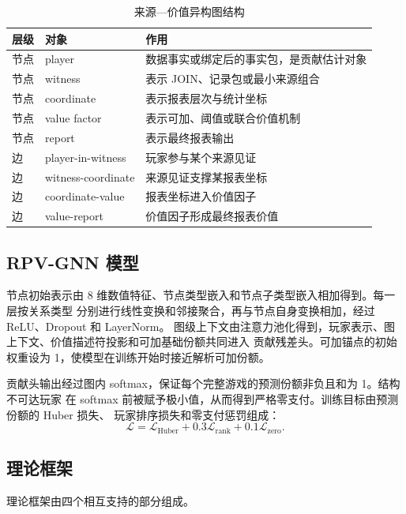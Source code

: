 \documentclass{coursepaper}
\begin{document}
\begin{table}[htbp]
  \centering
  \caption{来源—价值异构图结构}
  \label{tab:graph-schema}
  \small
  \begin{tabularx}{\textwidth}{@{}p{}p{}X@{}}
    \hline
    层级 & 对象 & 作用 \\
    \hline
    节点 & player & 数据事实或绑定后的事实包，是贡献估计对象 \\
    节点 & witness & 表示 JOIN、记录包或最小来源组合 \\
    节点 & coordinate & 表示报表层次与统计坐标 \\
    节点 & value factor & 表示可加、阈值或联合价值机制 \\
    节点 & report & 表示最终报表输出 \\
    边 & player-in-witness & 玩家参与某个来源见证 \\
    边 & witness-coordinate & 来源见证支撑某报表坐标 \\
    边 & coordinate-value & 报表坐标进入价值因子 \\
    边 & value-report & 价值因子形成最终报表价值 \\
    \hline
  \end{tabularx}
\end{table}

\subsection{RPV-GNN 模型}

节点初始表示由 8 维数值特征、节点类型嵌入和节点子类型嵌入相加得到。每一层按关系类型
分别进行线性变换和邻接聚合，再与节点自身变换相加，经过 ReLU、Dropout 和 LayerNorm。
图级上下文由注意力池化得到，玩家表示、图上下文、价值描述符投影和可加基础份额共同进入
贡献残差头。可加锚点的初始权重设为 1，使模型在训练开始时接近解析可加份额。

贡献头输出经过图内 softmax，保证每个完整游戏的预测份额非负且和为 1。结构不可达玩家
在 softmax 前被赋予极小值，从而得到严格零支付。训练目标由预测份额的 Huber 损失、
玩家排序损失和零支付惩罚组成：
\[
  \mathcal{L}
  =
  \mathcal{L}_{\mathrm{Huber}}
  +0.3\mathcal{L}_{\mathrm{rank}}
  +0.1\mathcal{L}_{\mathrm{zero}}.
\]

\subsection{理论框架}

理论框架由四个相互支持的部分组成。
\end{document}

